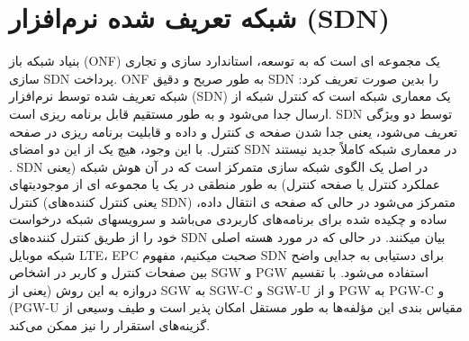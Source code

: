 \section{شبکه تعریف شده نرم‌افزار (SDN)}
بنیاد شبکه باز 
(ONF) 
یک مجموعه ای است که به توسعه، استاندارد سازی و تجاری سازی SDN 
پرداخت.
ONF
 به طور صریح و دقیق SDN را بدین صورت تعریف کرد:
 شبکه تعریف شده توسط نرم‌افزار (SDN) یک معماری شبکه است که کنترل شبکه از ارسال جدا می‌شود و به طور مستقیم قابل برنامه ریزی است.
 SDN توسط دو ویژگی تعریف می‌شود، یعنی جدا شدن صفحه ی کنترل و داده و قابلیت برنامه ریزی در صفحه کنترل.
 با این وجود، هیچ یک از این دو امضای SDN در معماری شبکه کاملاً جدید نیستند
 \cite{SDN1}.
 SDN 
 در اصل یک الگوی شبکه سازی متمرکز است که در آن هوش شبکه (یعنی عملکرد کنترل یا صفحه کنترل) به طور منطقی در یک یا مجموعه ای از موجودیتهای کنترل (یعنی کنترل کننده‌های SDN) متمرکز می‌شود در حالی که صفحه ی انتقال داده،  ساده و چکیده شده برای برنامه‌‌های کاربردی می‌باشد و سرویسهای شبکه درخواست خود را از طریق کنترل کننده‌های SDN
 بیان میکنند.
 در حالی که در مورد هسته اصلی شبکه موبایل LTE، EPC صحبت میکنیم، مفهوم SDN برای دستیابی به جدایی واضح بین صفحات کنترل و کاربر در اشخاص SGW و PGW استفاده می‌شود.
 با تقسیم دروازه به این روش (یعنی از SGW به SGW-C و
SGW-U 
و از PGW به PGW-C و (PGW-U 
  مقیاس بندی این مؤلفه‌‌ها به طور مستقل امکان پذیر است و طیف وسیعی از گزینه‌‌های استقرار را نیز ممکن می‌کند.
  
